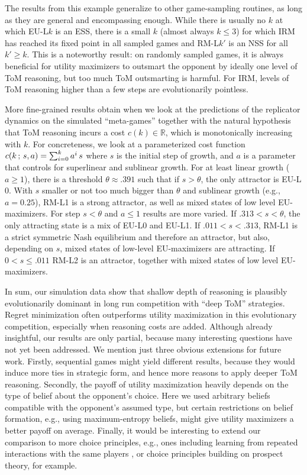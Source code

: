 \documentclass{llncs}
\begin{document}
The results from this example generalize to other game-sampling
routines, as long as they are general and encompassing enough.  While
there is usually no $k$ at which EU-L$k$ is an ESS, there is a small
$k$ (almost always $k\le 3$) for which IRM has reached its fixed point
in all sampled games and RM-L$k'$ is an NSS for all $k' \ge k$. This
is a noteworthy result: on randomly sampled games, it is always
beneficial for utility maximizers to outsmart the opponent by ideally
one level of ToM reasoning, but too much ToM outsmarting is
harmful. For IRM, levels of ToM reasoning higher than a few steps are
evolutionarily pointless.

More fine-grained results obtain when we look at the predictions of
the replicator dynamics on the simulated ``meta-games'' together with
the natural hypothesis that ToM reasoning incurs a cost $c(k) \in
\mathds{R}$, which is monotonically increasing with $k$. For
concreteness, we look at a parameterized cost function $c(k \thinspace
; \thinspace s, a ) = \sum_{i=0}^{k} a^i \thinspace s$ where $s$ is
the initial step of growth, and $a$ is a parameter that controls for
superlinear and sublinear growth. For at least linear growth ($a \ge
1$), there is a threshold $\theta \approx .391$ such that if $s >
\theta$, the only attractor is EU-L$0$. With $s$ smaller or not too
much bigger than $\theta$ and sublinear growth (e.g., $a=0.25$), RM-L1
is a strong attractor, as well as mixed states of low level
EU-maximizers. For step $s < \theta$ and $a \le 1$ results are more varied. If $.313
< s < \theta$, the only attracting state is a mix of EU-L0 and
EU-L1. If $.011 < s < .313$, RM-L1 is a strict symmetric Nash
equilibrium and therefore an attractor, but also, depending on $s$,
mixed states of low-level EU-maximizers are attracting. If $0 < s \le
.011$ RM-L2 is an attractor, together with mixed states of low level
EU-maximizers.

In sum, our simulation data show that shallow depth of reasoning is
plausibly evolutionarily dominant in long run competition with ``deep
ToM'' strategies. Regret minimization often outperforms utility
maximization in this evolutionary competition, especially when
reasoning costs are added. Although already insightful, our results
are only partial, because many interesting questions have not yet been
addressed. We mention just three obvious extensions for future
work. Firstly, sequential games might yield different results, because
they would induce more ties in strategic form, and hence more reasons
to apply deeper ToM reasoning. Secondly, the payoff of utility
maximization heavily depends on the type of belief about the
opponent's choice. Here we used arbitrary beliefs compatible with the
opponent's assumed type, but certain restrictions on belief formation,
e.g., using maximum-entropy beliefs, might give utility maximizers a
better payoff on average. Finally, it would be interesting to extend
our comparison to more choice principles, e.g., ones including
learning from repeated interactions with the same players
\citep[e.g.][]{Weerdde-WeerdVerbrugge2013:How-much-does-i}, or choice
principles building on prospect theory, for example.

\newpage

\printbibliography[heading=bibintoc]
\end{document}
